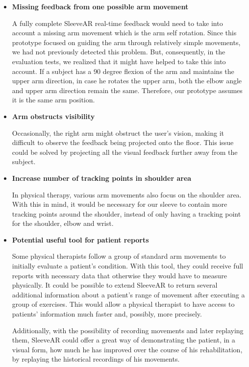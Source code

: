 \begin{itemize}
\item \textbf{Missing feedback from one possible arm movement}

A fully complete SleeveAR real-time feedback would need to take into account a missing arm movement which is the arm self rotation. Since this prototype focused on guiding the arm through relatively simple movements, we had not previously detected this problem. But, consequently, in the evaluation tests, we realized that it might have helped to take this into account. If a subject has a 90 degree flexion of the arm and maintains the upper arm direction, in case he rotates the upper arm, both the elbow angle and upper arm direction remain the same. Therefore, our prototype assumes it is the same arm position.

\item \textbf{Arm obstructs visibility}

Occasionally, the right arm might obstruct the user's vision, making it difficult to observe the feedback being projected onto the floor. This issue could be solved by projecting all the visual feedback further away from the subject.

\item \textbf{Increase number of tracking points in shoulder area}

In physical therapy, various arm movements also focus on the shoulder area. With this in mind, it would be necessary for our sleeve to contain more tracking points around the shoulder, instead of only having a tracking point for the shoulder, elbow and wrist.

\item \textbf{Potential useful tool for patient reports}

Some physical therapists follow a group of standard arm movements to initially evaluate a patient's condition. With this tool, they could receive full reports with necessary data that otherwise they would have to measure physically. It could be possible to extend SleeveAR to return several additional information about a patient's range of movement after executing a group of exercises. This would allow a physical therapist to have access to patients' information much faster and, possibly, more precisely. 

Additionally, with the possibility of recording movements and later replaying them, SleeveAR could offer a great way of demonstrating the patient, in a visual form, how much he has improved over the course of his rehabilitation, by replaying the historical recordings of his movements.


\end{itemize}
